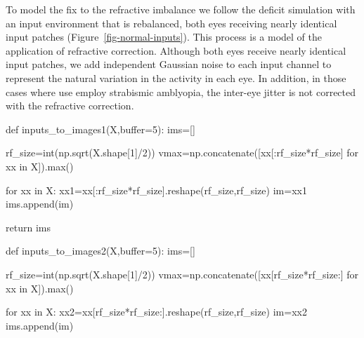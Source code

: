 \documentclass[
  letterpaper,
  DIV=11,
  numbers=noendperiod]{scrreprt}
\newenvironment{Shaded}{\begin{snugshade}}{\end{snugshade}}
\newcommand{\BuiltInTok}[1]{\textcolor[rgb]{0.00,0.23,0.31}{#1}}
\newcommand{\ControlFlowTok}[1]{\textcolor[rgb]{0.00,0.23,0.31}{#1}}
\newcommand{\DecValTok}[1]{\textcolor[rgb]{0.68,0.00,0.00}{#1}}
\newcommand{\KeywordTok}[1]{\textcolor[rgb]{0.00,0.23,0.31}{#1}}
\newcommand{\NormalTok}[1]{\textcolor[rgb]{0.00,0.23,0.31}{#1}}
\newcommand{\OperatorTok}[1]{\textcolor[rgb]{0.37,0.37,0.37}{#1}}
\begin{document}
To model the fix to the refractive imbalance we follow the deficit
simulation with an input environment that is rebalanced, both eyes
receiving nearly identical input patches
(Figure~\ref{fig-normal-inputs}). This process is a model of the
application of refractive correction. Although both eyes receive nearly
identical input patches, we add independent Gaussian noise to each input
channel to represent the natural variation in the activity in each eye.
In addition, in those cases where use employ strabismic amblyopia, the
inter-eye jitter is not corrected with the refractive correction.

\begin{Shaded}
\begin{Highlighting}[]
\KeywordTok{def}\NormalTok{ inputs\_to\_images1(X,}\BuiltInTok{buffer}\OperatorTok{=}\DecValTok{5}\NormalTok{):}
\NormalTok{    ims}\OperatorTok{=}\NormalTok{[]}
    
\NormalTok{    rf\_size}\OperatorTok{=}\BuiltInTok{int}\NormalTok{(np.sqrt(X.shape[}\DecValTok{1}\NormalTok{]}\OperatorTok{/}\DecValTok{2}\NormalTok{))}
\NormalTok{    vmax}\OperatorTok{=}\NormalTok{np.concatenate([xx[:rf\_size}\OperatorTok{*}\NormalTok{rf\_size] }\ControlFlowTok{for}\NormalTok{ xx }\KeywordTok{in}\NormalTok{ X]).}\BuiltInTok{max}\NormalTok{()}
    
    \ControlFlowTok{for}\NormalTok{ xx }\KeywordTok{in}\NormalTok{ X:}
\NormalTok{        xx1}\OperatorTok{=}\NormalTok{xx[:rf\_size}\OperatorTok{*}\NormalTok{rf\_size].reshape(rf\_size,rf\_size)}
\NormalTok{        im}\OperatorTok{=}\NormalTok{xx1}
\NormalTok{        ims.append(im)}
        
    \ControlFlowTok{return}\NormalTok{ ims}

\KeywordTok{def}\NormalTok{ inputs\_to\_images2(X,}\BuiltInTok{buffer}\OperatorTok{=}\DecValTok{5}\NormalTok{):}
\NormalTok{    ims}\OperatorTok{=}\NormalTok{[]}
    
\NormalTok{    rf\_size}\OperatorTok{=}\BuiltInTok{int}\NormalTok{(np.sqrt(X.shape[}\DecValTok{1}\NormalTok{]}\OperatorTok{/}\DecValTok{2}\NormalTok{))}
\NormalTok{    vmax}\OperatorTok{=}\NormalTok{np.concatenate([xx[rf\_size}\OperatorTok{*}\NormalTok{rf\_size:] }\ControlFlowTok{for}\NormalTok{ xx }\KeywordTok{in}\NormalTok{ X]).}\BuiltInTok{max}\NormalTok{()}
    
    \ControlFlowTok{for}\NormalTok{ xx }\KeywordTok{in}\NormalTok{ X:}
\NormalTok{        xx2}\OperatorTok{=}\NormalTok{xx[rf\_size}\OperatorTok{*}\NormalTok{rf\_size:].reshape(rf\_size,rf\_size)}
\NormalTok{        im}\OperatorTok{=}\NormalTok{xx2}
\NormalTok{        ims.append(im)}
        

\end{Highlighting}
\end{Shaded}
\end{document}
